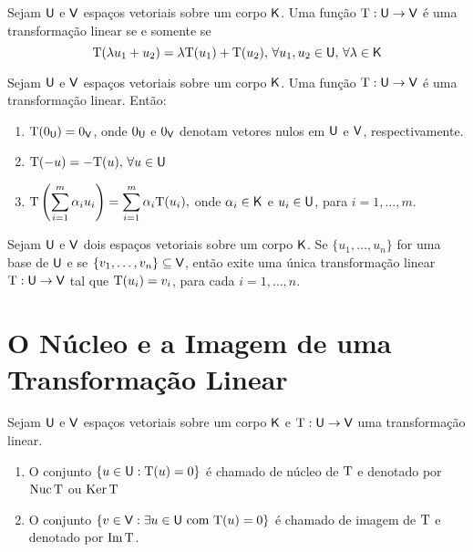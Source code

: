 \documentclass[10pt,a4paper]{book}
\begin{document}
\begin{lemma}
	Sejam $\mathsf{ U }$ e $\mathsf{ V }$ espaços vetoriais sobre um corpo $\mathsf{ K }$. Uma função $\mathrm{ T } : \mathsf{ U } \rightarrow \mathsf{ V }$ é uma transformação linear se e somente se
	\[
		\mathrm{ T }(\lambda u_1 + u_2) = \lambda \mathrm{ T }(u_1) + \mathrm{ T }(u_2), \, \forall u_1, u_2 \in \mathsf{ U }, \, \forall \lambda \in \mathsf{ K }
	\]
\end{lemma}

\begin{lemma}
	Sejam $\mathsf{ U }$ e $\mathsf{ V }$ espaços vetoriais sobre um corpo $\mathsf{ K }$. Uma função $\mathrm{ T } : \mathsf{ U } \rightarrow \mathsf{ V }$ é uma transformação linear. Então:
	\begin{enumerate}
		\item $\mathrm{ T }(0_{\mathsf{ U }}) = 0_{\mathsf{ V }}$, onde $0_{\mathsf{ U }}$ e $0_{\mathsf{ V }}$ denotam vetores nulos em $\mathsf{ U }$ e $\mathsf{ V }$, respectivamente.
		\item $\mathrm{ T }(-u) = -\mathrm{ T }(u), \, \forall u \in \mathsf{ U }$
		\item $\displaystyle \mathrm{ T }\left(\sum_{i = 1}^{m} \alpha_i u_i\right) = \sum_{i = 1}^{m} \alpha_i \mathrm{ T }(u_i),$ onde $\alpha_i \in \mathsf{ K }$ e $u_i \in \mathsf{ U }$, para $i = 1, \dots, m$.
	\end{enumerate}
\end{lemma}

\begin{theorem}
	Sejam $\mathsf{ U }$ e $\mathsf{ V }$ dois espaços vetoriais sobre um corpo $\mathsf{ K }$. Se $\{ u_1, \dots, u_n\}$ for uma base de $\mathsf{ U }$ e se $\{ v_1, \dots, v_n \} \subseteq \mathsf{ V }$, então exite uma única transformação linear $\mathrm{ T } : \mathsf{ U } \rightarrow \mathsf{ V }$ tal que $\mathrm{ T }(u_i) = v_i$, para cada $i = 1, \dots, n $.
\end{theorem}




\section{O Núcleo e a Imagem de uma Transformação Linear}
\begin{definition}
	Sejam $\mathsf{ U }$ e $\mathsf{ V }$ espaços vetoriais sobre um corpo $\mathsf{ K }$ e $\mathrm{ T } : \mathsf{ U } \rightarrow \mathsf{ V }$ uma transformação linear. 
	\begin{enumerate}
		\item O conjunto $\{ u \in \mathsf{ U } : \mathrm{ T }(u) = 0 \}$ é chamado de núcleo de $\mathrm{ T }$ e denotado por $\mathrm{ Nuc }\, \mathrm{ T }$ ou $\mathrm{ Ker }\, \mathrm{ T }$
		\item O conjunto $\{ v \in \mathsf{ V } : \exists u \in \mathsf{ U } \text{ com } \mathrm{ T }(u) = 0 \}$ é chamado de imagem de $\mathrm{ T }$ e denotado por $\mathrm{ Im }\, \mathrm{ T }$.
	\end{enumerate}
\end{definition}
\end{document}
